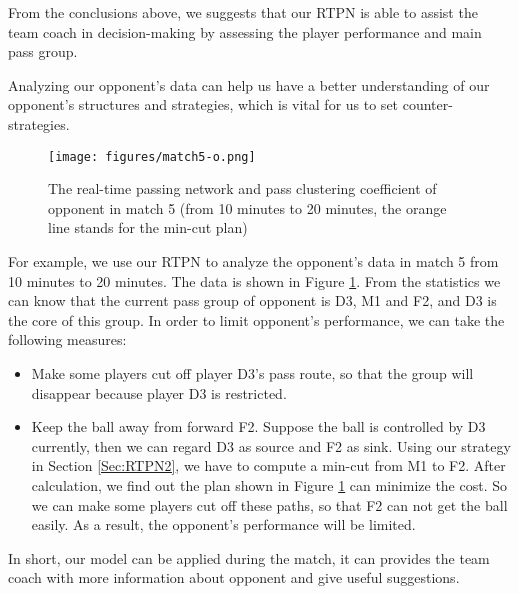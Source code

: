 \documentclass{mcmthesis}
\begin{document}
From the conclusions above, we suggests that our RTPN is able to assist the team coach in decision-making by assessing the player performance and main pass group.

Analyzing our opponent's data can help us have a better understanding of our opponent's structures and strategies, which is vital for us to set counter-strategies.

\begin{figure}[htbp]
    \centering
    \texttt{[image: figures/match5-o.png]}
    \caption{The real-time passing network and pass clustering coefficient of opponent in match 5 (from 10 minutes to 20 minutes, the orange line stands for the min-cut plan)} \label{666}
\end{figure}

For example, we use our RTPN to analyze the opponent's data in match 5 from 10 minutes to 20 minutes. The data is shown in Figure \ref{666}. From the statistics we can know that the current pass group of opponent is D3, M1 and F2, and D3 is the core of this group. In order to limit opponent's performance, we can take the following measures:
\begin{itemize}
    \item Make some players cut off player D3's pass route, so that the group will disappear because player D3 is restricted.
    \item Keep the ball away from forward F2. Suppose the ball is controlled by D3 currently, then we can regard D3 as source and F2 as sink. Using our strategy in Section \ref{Sec:RTPN2}, we have to compute a min-cut from M1 to F2. After calculation, we find out the plan shown in Figure \ref{666} can minimize the cost. So we can make some players cut off these paths, so that F2 can not get the ball easily. As a result, the opponent's performance will be limited.
\end{itemize}

In short, our model can be applied during the match, it can provides the team coach with more information about opponent and give useful suggestions.
\end{document}
